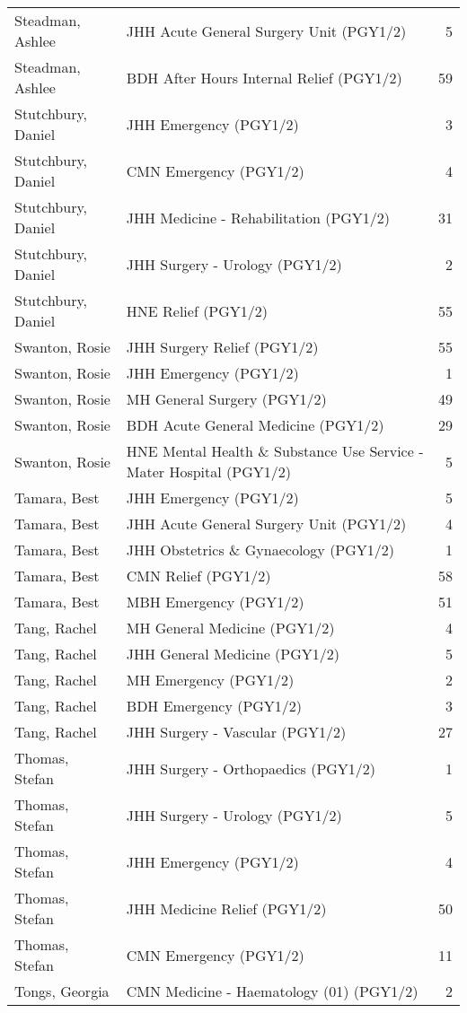 \documentclass[
]{article}
\begin{document}
\begin{longtable}{llr}
Steadman, Ashlee & JHH Acute General Surgery Unit (PGY1/2) & 5 \\ 
Steadman, Ashlee & BDH After Hours Internal Relief (PGY1/2) & 59 \\ 
Stutchbury, Daniel & JHH Emergency (PGY1/2) & 3 \\ 
Stutchbury, Daniel & CMN Emergency (PGY1/2) & 4 \\ 
Stutchbury, Daniel & JHH Medicine - Rehabilitation (PGY1/2) & 31 \\ 
Stutchbury, Daniel & JHH Surgery - Urology (PGY1/2) & 2 \\ 
Stutchbury, Daniel & HNE Relief (PGY1/2) & 55 \\ 
Swanton, Rosie & JHH Surgery Relief (PGY1/2) & 55 \\ 
Swanton, Rosie & JHH Emergency (PGY1/2) & 1 \\ 
Swanton, Rosie & MH General Surgery (PGY1/2) & 49 \\ 
Swanton, Rosie & BDH Acute General Medicine (PGY1/2) & 29 \\ 
Swanton, Rosie & HNE Mental Health \& Substance Use Service - Mater Hospital (PGY1/2) & 5 \\ 
Tamara, Best & JHH Emergency (PGY1/2) & 5 \\ 
Tamara, Best & JHH Acute General Surgery Unit (PGY1/2) & 4 \\ 
Tamara, Best & JHH Obstetrics \& Gynaecology (PGY1/2) & 1 \\ 
Tamara, Best & CMN Relief (PGY1/2) & 58 \\ 
Tamara, Best & MBH Emergency (PGY1/2) & 51 \\ 
Tang, Rachel & MH General Medicine (PGY1/2) & 4 \\ 
Tang, Rachel & JHH General Medicine (PGY1/2) & 5 \\ 
Tang, Rachel & MH Emergency (PGY1/2) & 2 \\ 
Tang, Rachel & BDH Emergency (PGY1/2) & 3 \\ 
Tang, Rachel & JHH Surgery - Vascular (PGY1/2) & 27 \\ 
Thomas, Stefan & JHH Surgery - Orthopaedics (PGY1/2) & 1 \\ 
Thomas, Stefan & JHH Surgery - Urology (PGY1/2) & 5 \\ 
Thomas, Stefan & JHH Emergency (PGY1/2) & 4 \\ 
Thomas, Stefan & JHH Medicine Relief (PGY1/2) & 50 \\ 
Thomas, Stefan & CMN Emergency (PGY1/2) & 11 \\ 
Tongs, Georgia & CMN Medicine - Haematology (01) (PGY1/2) & 2 \\ 

\end{longtable}
\end{document}
